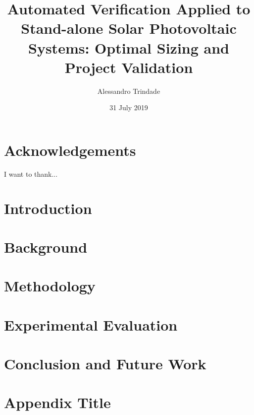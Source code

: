 \documentclass[12pt,twoside]{report}
\title{Automated Verification Applied to Stand-alone Solar Photovoltaic Systems: Optimal Sizing and Project Validation}
\author{Alessandro Trindade}
\date{31 July 2019}
\begin{document}




%
%
\chapter*{Acknowledgements}
I want to thank...

\tableofcontents

\listoffigures

\listoftables

\chapter{Introduction}


\chapter{Background}


\chapter{Methodology}


\chapter{Experimental Evaluation}


\chapter{Conclusion and Future Work}


\appendix
\chapter{Appendix Title}


{}
\end{document}
